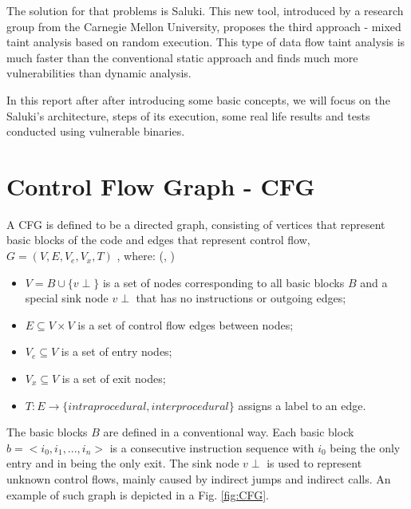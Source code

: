 \documentclass[a4paper, 12pt, journal, onecolumn]{IEEEtran}
\begin{document}
The solution for that problems is Saluki. This new tool, introduced by a research group from the Carnegie Mellon University, proposes the third approach - mixed taint analysis based on random execution. This type of data flow taint analysis is much faster than the conventional static approach and finds much more vulnerabilities than dynamic analysis.\cite{saluki} 

In this report after after introducing some basic concepts, we will focus on the Saluki's architecture, steps of its execution, some real life results and tests conducted using vulnerable binaries.
\pagebreak


\section{Control Flow Graph - CFG}

A CFG is defined to be a directed graph, consisting of vertices that represent basic blocks of the code and edges that represent control flow, $G = (V,E,V_e,V_x,T)$ , where: (\cite{CFG}, \cite{binaries})
\begin{itemize}
    \item $V = B ∪ \{v\perp\}$ is a set of nodes corresponding to all basic blocks $B$ and a special sink node $v\perp$ that has no instructions or outgoing edges;
    \item $E \subseteq V \times V$ is a set of control flow edges between nodes; 
    \item $V_e \subseteq V$ is a set of entry nodes;
    \item $V_x \subseteq V$ is a set of exit nodes;
    \item $ T : E \rightarrow \{intraprocedural, interprocedural\} $ assigns a label to an edge.

\end{itemize}
The basic blocks $B$ are defined in a conventional way. Each basic block $ b =< i_0, i_1, . . . , i_n > $ is a consecutive instruction sequence with $i_0$ being the only entry and in being the only exit. The sink node $v\perp$ is used to represent unknown control flows, mainly caused by indirect jumps and indirect calls.\cite{CFG2} An example of such graph is depicted in a Fig. \ref{fig:CFG}.
\end{document}
